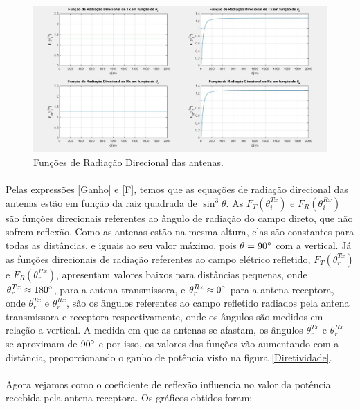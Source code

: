 \FloatBarrier
\begin{figure}[!htp]
\centering
\includegraphics[scale = 0.3]{Figuras/Funcao_Radiacao_Direcional.JPG}
\caption{Funções de Radiação Direcional das antenas.}
\end{figure}
\FloatBarrier

\paragraph{}Pelas expressões \ref{Ganho} e \ref{F}, temos que as equações de radiação direcional das antenas estão em função da raiz quadrada de $\sin^3 \theta$. As $F_T(\theta_i^{Tx})$ e $F_R(\theta_i^{Rx})$ são funções direcionais referentes ao ângulo de radiação do campo direto, que não sofrem reflexão. Como as antenas estão na mesma altura, elas são constantes para todas as distâncias, e iguais ao seu valor máximo, pois $\theta = 90\degree$ com a vertical. Já as funções direcionais de radiação referentes ao campo elétrico refletido, $F_T(\theta_r^{Tx})$ e $F_R(\theta_r^{Rx})$, apresentam valores baixos para distâncias pequenas, onde $\theta_r^{Tx} \approx 180\degree$, para a antena transmissora, e $\theta_r^{Rx} \approx 0\degree$ para a antena receptora, onde $\theta_r^{Tx}$ e $\theta_r^{Rx}$, são os ângulos referentes ao campo refletido radiados pela antena transmissora e receptora respectivamente, onde os ângulos são medidos em relação a vertical. A medida em que as antenas se afastam, os ângulos  $\theta_r^{Tx}$ e $\theta_r^{Rx}$ se aproximam de $90\degree$ e por isso, os valores das funções vão aumentando com a distância, proporcionando o ganho de potência visto na figura \ref{Diretividade}.

\paragraph{}Agora vejamos como o coeficiente de reflexão influencia no valor da potência recebida pela antena receptora. Os gráficos obtidos foram:


